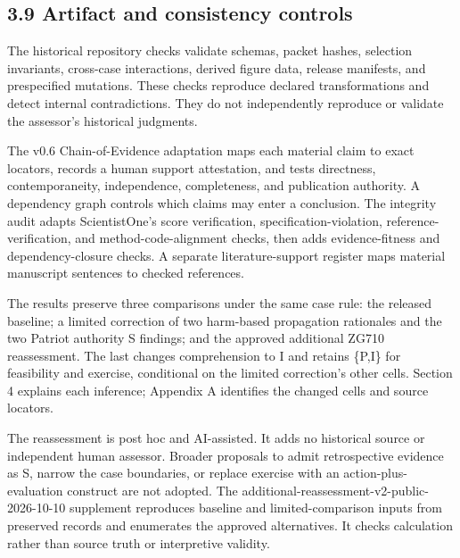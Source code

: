 \documentclass[11pt]{article}
\begin{document}
\subsection*{3.9 Artifact and consistency controls}

The historical repository checks validate schemas, packet hashes, selection invariants, cross-case interactions, derived figure data, release manifests, and prespecified mutations. These checks reproduce declared transformations and detect internal contradictions. They do not independently reproduce or validate the assessor's historical judgments.

The v0.6 Chain-of-Evidence adaptation maps each material claim to exact locators, records a human support attestation, and tests directness, contemporaneity, independence, completeness, and publication authority. A dependency graph controls which claims may enter a conclusion. The integrity audit adapts ScientistOne's score verification, specification-violation, reference-verification, and method-code-alignment checks, then adds evidence-fitness and dependency-closure checks. A separate literature-support register maps material manuscript sentences to checked references.

The results preserve three comparisons under the same case rule: the released baseline; a limited correction of two harm-based propagation rationales and the two Patriot authority S findings; and the approved additional ZG710 reassessment. The last changes comprehension to I and retains \{P,I\} for feasibility and exercise, conditional on the limited correction’s other cells. Section 4 explains each inference; Appendix A identifies the changed cells and source locators.

The reassessment is post hoc and AI-assisted. It adds no historical source or independent human assessor. Broader proposals to admit retrospective evidence as S, narrow the case boundaries, or replace exercise with an action-plus-evaluation construct are not adopted. The additional-reassessment-v2-public-2026-10-10 supplement reproduces baseline and limited-comparison inputs from preserved records and enumerates the approved alternatives. It checks calculation rather than source truth or interpretive validity.
\end{document}
